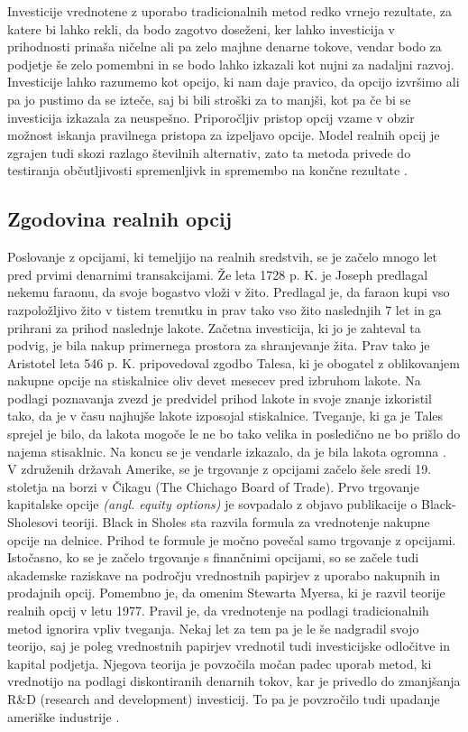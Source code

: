 Investicije vrednotene z uporabo tradicionalnih metod redko vrnejo rezultate, za katere bi lahko rekli, da bodo zagotvo doseženi, ker lahko investicija v prihodnosti prinaša ničelne ali pa zelo majhne denarne tokove, vendar bodo za podjetje še zelo pomembni in se bodo lahko izkazali kot nujni za nadaljni razvoj. Investicije lahko razumemo kot opcijo, ki nam daje pravico, da opcijo izvršimo ali pa jo pustimo da se izteče, saj bi bili stroški za to manjši, kot pa če bi se investicija izkazala za neuspešno. Priporočljiv pristop opcij vzame v obzir možnost iskanja pravilnega pristopa za izpeljavo opcije. Model realnih opcij je zgrajen tudi skozi razlago številnih alternativ, zato ta metoda privede do testiranja občutljivosti spremenljivk in spremembo na končne rezultate \cite[str. 93, 94]{Mun}. \\

\subsection{Zgodovina realnih opcij}
Poslovanje z opcijami, ki temeljijo na realnih sredstvih, se je začelo mnogo let pred prvimi denarnimi transakcijami. Že leta 1728 p. K. je Joseph predlagal nekemu faraonu, da svoje bogastvo vloži v žito. Predlagal je, da faraon kupi vso razpoložljivo žito v tistem trenutku in prav tako vso žito naslednjih 7 let in ga prihrani za prihod naslednje lakote. Začetna investicija, ki jo je zahteval ta podvig, je bila nakup primernega prostora za shranjevanje žita. Prav tako je Aristotel leta 546 p. K. pripovedoval zgodbo Talesa, ki je obogatel z oblikovanjem nakupne opcije na stiskalnice oliv devet mesecev pred izbruhom lakote. Na podlagi poznavanja zvezd je predvidel prihod lakote in svoje znanje izkoristil tako, da je v času najhujše lakote izposojal stiskalnice. Tveganje, ki ga je Tales sprejel je bilo, da lakota mogoče le ne bo tako velika in posledično ne bo prišlo do najema stisaklnic. Na koncu se je vendarle izkazalo, da je bila lakota ogromna \cite[str. 13]{Brach}. \\

V združenih državah Amerike, se je trgovanje z opcijami začelo šele sredi 19. stoletja na borzi v Čikagu (The Chichago Board of Trade). Prvo trgovanje kapitalske opcije \textit{(angl. equity options)} je sovpadalo z objavo publikacije o Black-Sholesovi teoriji. Black in Sholes sta razvila formula za vrednotenje nakupne opcije na delnice. Prihod te formule je močno povečal samo trgovanje z opcijami. Istočasno, ko se je začelo trgovanje s finančnimi opcijami, so se začele tudi akademske raziskave na področju vrednostnih papirjev z uporabo nakupnih in prodajnih opcij. Pomembno je, da omenim Stewarta Myersa, ki je razvil teorije realnih opcij v letu 1977. Pravil je, da vrednotenje na podlagi tradicionalnih metod ignorira vpliv tveganja. Nekaj let za tem pa je le še nadgradil svojo teorijo, saj je poleg vrednostnih papirjev vrednotil tudi investicijske odločitve in kapital podjetja. Njegova teorija je povzočila močan padec uporab metod, ki vrednotijo na podlagi diskontiranih denarnih tokov, kar je privedlo do zmanjšanja R\&D (research and development) investicij. To pa je povzročilo tudi upadanje ameriške industrije \cite[str. 14, 15]{Brach}.  \\

